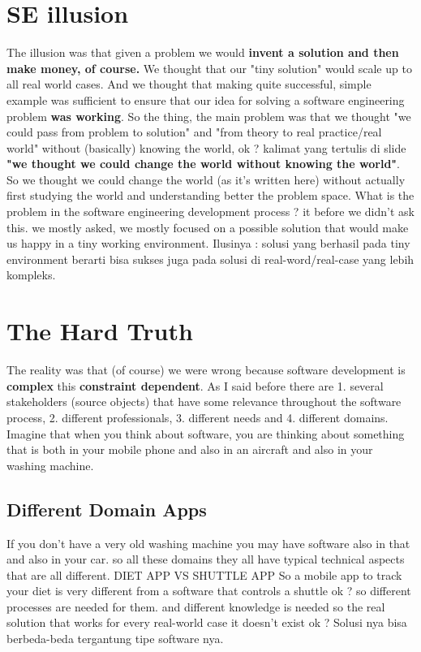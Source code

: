 \documentclass[conference, compsoc, twoside]{IEEEtran}
\begin{document}
\section{SE illusion} %
The illusion was that given a problem we would \textbf{invent a solution and then make money, of course.} 
We thought that our "tiny solution" would scale up to all real world cases. 
And we thought that making quite successful, simple example was sufficient to ensure that our idea for solving a software engineering problem \textbf{was working}. 
So the thing, the main problem was that we thought 
"we could pass from problem to solution" and 
"from theory to real practice/real world" without (basically) knowing the world, ok ?
kalimat yang tertulis di slide \textbf{"we thought we could change the world without knowing the world"}.
So we thought we could change the world (as it's written here) without actually first studying the world and understanding better the problem space. 
What is the problem in the software engineering development process ? 
it before we didn't ask this. 
we mostly asked, we mostly focused on a possible solution that would make us happy in a tiny working environment.
Ilusinya : solusi yang berhasil pada tiny environment berarti bisa sukses juga pada solusi di real-word/real-case yang lebih kompleks.
\section{The Hard Truth} %
\label{sec:the_hard_truth}
The reality was that (of course) we were wrong because software development is \textbf{complex} this \textbf{constraint dependent}. 
As I said before there are 
1. several stakeholders (source objects) that have some relevance throughout the software process, 
2. different professionals, 
3. different needs and 
4. different domains.
Imagine that when you think about software, you are thinking about something that is both in your mobile phone and also in an aircraft and also in your washing machine.

\subsection{Different Domain Apps} %
If you don't have a very old washing machine you may have software also in that and also in your car.
so all these domains they all have typical technical aspects that are all different. 
DIET APP VS SHUTTLE APP
So a mobile app to track your diet is very different from a software that controls a shuttle ok ? 
so different processes are needed for them. 
and different knowledge is needed so the real solution that works for every real-world case it doesn't exist ok ? 
Solusi nya bisa berbeda-beda tergantung tipe software nya.
\end{document}
